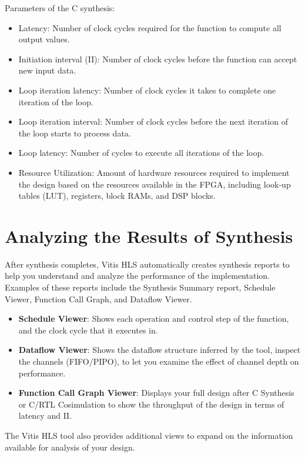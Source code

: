 Parameters of the C synthesis:
\begin{itemize}
  \item Latency: Number of clock cycles required for the function to compute all output values.
  \item Initiation interval (II): Number of clock cycles before the function can accept new input data.
  \item Loop iteration latency: Number of clock cycles it takes to complete one iteration of the loop.
  \item Loop iteration interval: Number of clock cycles before the next iteration of the loop starts to
  process data.
  \item Loop latency: Number of cycles to execute all iterations of the loop.
  \item Resource Utilization: Amount of hardware resources required to implement the design based on the resources available in the FPGA, including look-up tables (LUT), registers, block RAMs, and DSP blocks.
\end{itemize}

\clearpage
\section{Analyzing the Results of Synthesis}
After synthesis completes, Vitis HLS automatically creates synthesis reports to help you understand and analyze the performance of the implementation. Examples of these reports include the Synthesis Summary report, Schedule Viewer, Function Call Graph, and Dataflow Viewer.

\begin{itemize}
  \item \textbf{Schedule Viewer}: Shows each operation and control step of the function, and the clock cycle that it executes in.
  \item \textbf{Dataflow Viewer}: Shows the dataflow structure inferred by the tool, inspect the channels (FIFO/PIPO), to let you examine the effect of channel depth on performance.
  \item \textbf{Function Call Graph Viewer}: Displays your full design after C Synthesis or C/RTL Cosimulation to show the throughput of the design in terms of latency and II.
\end{itemize}

The Vitis HLS tool also provides additional views to expand on the information available for analysis of your design.

